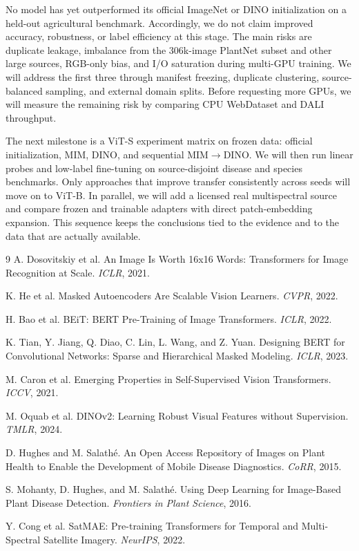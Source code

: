\documentclass[10pt,twocolumn,letterpaper]{article}
\begin{document}
No model has yet outperformed its official ImageNet or DINO initialization on a
held-out agricultural benchmark. Accordingly, we do not claim improved accuracy,
robustness, or label efficiency at this stage. The main risks are duplicate
leakage, imbalance from the 306k-image PlantNet subset and other large sources,
RGB-only bias, and I/O saturation during multi-GPU training. We will address the
first three through manifest freezing, duplicate clustering, source-balanced
sampling, and external domain splits. Before requesting more GPUs, we will
measure the remaining risk by comparing CPU WebDataset and DALI throughput.

The next milestone is a ViT-S experiment matrix on frozen data: official
initialization, MIM, DINO, and sequential MIM$\rightarrow$DINO. We will then run
linear probes and low-label fine-tuning on source-disjoint disease and species
benchmarks. Only approaches that improve transfer consistently across seeds will
move on to ViT-B. In parallel, we will add a licensed real multispectral source
and compare frozen and trainable adapters with direct patch-embedding expansion.
This sequence keeps the conclusions tied to the evidence and to the data that
are actually available.

{\small
\begin{thebibliography}{9}
A. Dosovitskiy et al. An Image Is Worth 16x16 Words: Transformers for Image
Recognition at Scale. \textit{ICLR}, 2021.

K. He et al. Masked Autoencoders Are Scalable Vision Learners.
\textit{CVPR}, 2022.

H. Bao et al. BEiT: BERT Pre-Training of Image Transformers.
\textit{ICLR}, 2022.

K. Tian, Y. Jiang, Q. Diao, C. Lin, L. Wang, and Z. Yuan. Designing BERT for
Convolutional Networks: Sparse and Hierarchical Masked Modeling. \textit{ICLR}, 2023.

M. Caron et al. Emerging Properties in Self-Supervised Vision Transformers.
\textit{ICCV}, 2021.

M. Oquab et al. DINOv2: Learning Robust Visual Features without Supervision.
\textit{TMLR}, 2024.

D. Hughes and M. Salath\'e. An Open Access Repository of Images on Plant Health
to Enable the Development of Mobile Disease Diagnostics. \textit{CoRR}, 2015.

S. Mohanty, D. Hughes, and M. Salath\'e. Using Deep Learning for Image-Based
Plant Disease Detection. \textit{Frontiers in Plant Science}, 2016.

Y. Cong et al. SatMAE: Pre-training Transformers for Temporal and Multi-Spectral
Satellite Imagery. \textit{NeurIPS}, 2022.
\end{thebibliography}
}
\end{document}
